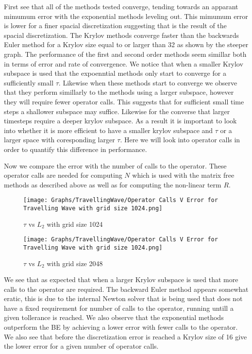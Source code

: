 First see that all of the methods tested converge, tending towards an apparant mimumum error with the exponential methods leveling out.
This mimumum error is lower for a finer spacial discretization suggesting that is the result of the spacial discretization.
The Krylov methods converge faster than the backwards Euler method for a Krylov size equal to or larger than 32 as shown by the steeper graph.
The performance of the first and second order methods seem simillar both in terms of error and rate of convergence.
We notice that when a smaller Krylov subspace is used that the expoenntial methods only start to converge for a sufficiently small $\tau$.
Likewise when these methods start to converge we observe that they perform simillarly to the methods using a larger subspace, however they will require fewer operator calls.
This suggests that for sufficient small time steps a shallower subspace may suffice.
Likewise for the converse that larger timesteps require a deeper krylov subspace.
As a result it is important to look into whether it is more efficient to have a smaller krylov subspace and $\tau$ or a larger space with coresponding larger $\tau$.
Here we will look into operator calls in order to quantify this difference in performance.

Now we compare the error with the number of calls to the operator.
These operator calls are needed for computing $N$ which is used with the matrix free methods as described above as well as for computing the non-linear term $R$.

\begin{figure}[H]
    \centering
    \begin{minipage}{0.49\textwidth}
        \texttt{[image: Graphs/TravellingWave/Operator Calls V Error for Travelling Wave with grid size 1024.png]} %
        \caption{$\tau$ vs $L_2$ with grid size 1024}
        \label{fig:plot1}
    \end{minipage}\hfill
    \centering
    \begin{minipage}{0.49\textwidth}
        \texttt{[image: Graphs/TravellingWave/Operator Calls V Error for Travelling Wave with grid size 1024.png]} %
        \caption{$\tau$ vs $L_2$ with grid size 2048}
        \label{fig:plot2}
    \end{minipage}\hfill
\end{figure}

We see that as expected that when a larger Krylov subspace is used that more calls to the operator are required.
The backward Euler method appears somewhat eratic, this is due to the internal Newton solver that is being used that does not have a fixed requirement for number of calls to the operator, running untill a given tollerance is reached.
We also observe that the exponential methods outperform the BE by achieving a lower error with fewer calls to the operator.
We also see that before the discretization error is reached a Krylov size of 16 give the lower error for a given number of operator calls.

